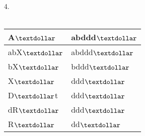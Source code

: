 4.
\\
\\
\begin{latin}
\begin{tabular}{ | m{5cm} | m{5cm} | } 
\hline
A{$\textdollar$} & abddd{$\textdollar$}  \\ 
\hline
abX{$\textdollar$} & abddd{$\textdollar$}  \\ 
\hline
bX{$\textdollar$} & bddd{$\textdollar$}  \\ 
\hline
X{$\textdollar$} & ddd{$\textdollar$}  \\ 
\hline
D{$\textdollar$}t & ddd{$\textdollar$}  \\ 
\hline
dR{$\textdollar$} & ddd{$\textdollar$}  \\ 
\hline
R{$\textdollar$} & dd{$\textdollar$}  \\ 
\hline
\end{tabular}
\end{latin}










